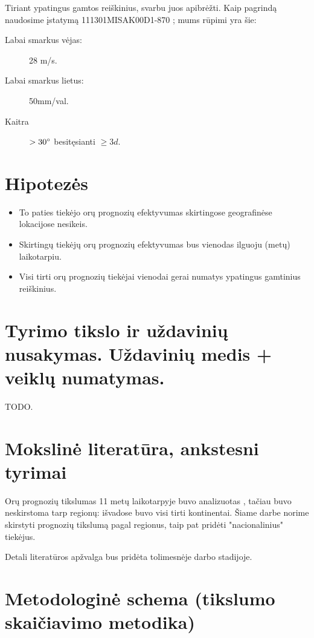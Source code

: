 \documentclass{article}
\begin{document}
Tiriant ypatingus gamtos reiškinius, svarbu juos apibrėžti. Kaip pagrindą
naudosime įstatymą 111301MISAK00D1-870 \cite{lrs-stichiniai}; mums rūpimi yra
šie:

\begin{description}
    \item[Labai smarkus vėjas:] 28 m/s.
    \item[Labai smarkus lietus:] 50mm/val.
    \item[Kaitra] $>30\degree$ besitęsianti $\geq 3d$.
\end{description}

\section{Hipotezės}

\begin{itemize}
    \item To paties tiekėjo orų prognozių efektyvumas skirtingose geografinėse
        lokacijose nesikeis.
    \item Skirtingų tiekėjų orų prognozių efektyvumas bus vienodas ilguoju
        (metų) laikotarpiu.
    \item Visi tirti orų prognozių tiekėjai vienodai gerai numatys ypatingus
        gamtinius reiškinius.
\end{itemize}

\section{Tyrimo tikslo ir uždavinių nusakymas. Uždavinių medis + veiklų numatymas.}

TODO.

\section{Mokslinė literatūra, ankstesni tyrimai}

Orų prognozių tikslumas 11 metų laikotarpyje buvo analizuotas
\cite{rose2017analysis}, tačiau buvo neskirstoma tarp regionų: išvadose buvo
visi tirti kontinentai. Šiame darbe norime skirstyti prognozių tikslumą pagal
regionus, taip pat pridėti "nacionalinius" tiekėjus.

Detali literatūros apžvalga bus pridėta tolimesnėje darbo stadijoje.

\section{Metodologinė schema (tikslumo skaičiavimo metodika)}
\end{document}
